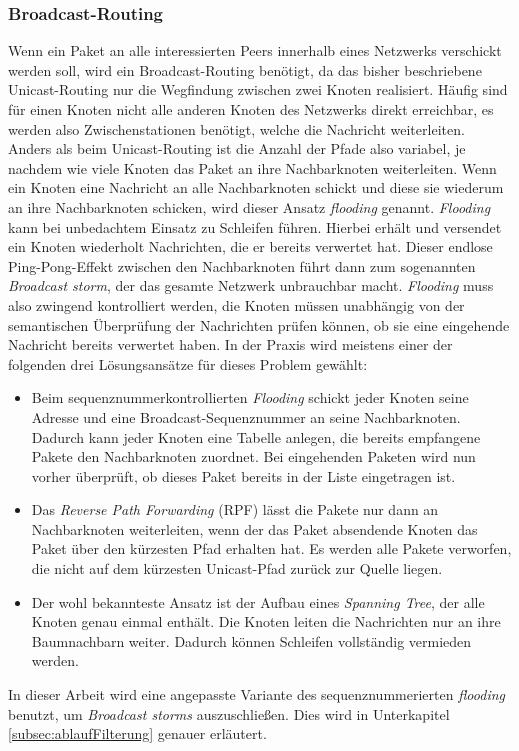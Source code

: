 \subsubsection{Broadcast-Routing}
Wenn ein Paket an alle interessierten Peers innerhalb eines Netzwerks verschickt werden soll, wird ein Broadcast-Routing benötigt, da das bisher beschriebene Unicast-Routing nur die Wegfindung zwischen zwei Knoten realisiert. Häufig sind für einen Knoten nicht alle anderen Knoten des Netzwerks direkt erreichbar, es werden also Zwischenstationen benötigt, welche die Nachricht weiterleiten. Anders als beim Unicast-Routing ist die Anzahl der Pfade also variabel, je nachdem wie viele Knoten das Paket an ihre Nachbarknoten weiterleiten. Wenn ein Knoten eine Nachricht an alle Nachbarknoten schickt und diese sie wiederum an ihre Nachbarknoten schicken, wird dieser Ansatz \textit{flooding} genannt. \textit{Flooding} kann bei unbedachtem Einsatz zu Schleifen führen. Hierbei erhält und versendet ein Knoten wiederholt Nachrichten, die er bereits verwertet hat. Dieser endlose Ping-Pong-Effekt zwischen den Nachbarknoten führt dann zum sogenannten \textit{Broadcast storm}, der das gesamte Netzwerk unbrauchbar macht. \textit{Flooding} muss also zwingend kontrolliert werden, die Knoten müssen unabhängig von der semantischen Überprüfung der Nachrichten prüfen können, ob sie eine eingehende Nachricht bereits verwertet haben. In der Praxis wird meistens einer der folgenden drei Lösungsansätze für dieses Problem gewählt:\newpage
\begin{itemize}
	\item Beim sequenznummerkontrollierten \textit{Flooding} schickt jeder Knoten seine Adresse und eine Broadcast-Sequenznummer an seine Nachbarknoten. Dadurch kann jeder Knoten eine Tabelle anlegen, die bereits empfangene Pakete den Nachbarknoten zuordnet. Bei eingehenden Paketen wird nun vorher überprüft, ob dieses Paket bereits in der Liste eingetragen ist. 
	\item Das \textit{Reverse Path Forwarding} (RPF) lässt die Pakete nur dann an Nachbarknoten weiterleiten, wenn der das Paket absendende Knoten das Paket über den kürzesten Pfad erhalten hat. Es werden alle Pakete verworfen, die nicht auf dem kürzesten Unicast-Pfad zurück zur Quelle liegen.
	\item Der wohl bekannteste Ansatz ist der Aufbau eines \textit{Spanning Tree}, der alle Knoten genau einmal enthält. Die Knoten leiten die Nachrichten nur an ihre Baumnachbarn weiter. Dadurch können Schleifen vollständig vermieden werden.\\
\end{itemize}
In dieser Arbeit wird eine angepasste Variante des sequenznummerierten \textit{flooding} benutzt, um \textit{Broadcast storms} auszuschließen. Dies wird in Unterkapitel \ref{subsec:ablaufFilterung} genauer erläutert.\\

